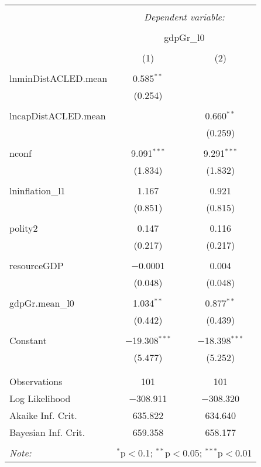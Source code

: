 \begin{table}[!htbp] \centering 
  \caption{} 
  \label{} 
\begin{tabular}{@{\extracolsep{5pt}}lcc} 
\\[-1.8ex]\hline 
\hline \\[-1.8ex] 
 & \multicolumn{2}{c}{\textit{Dependent variable:}} \\ 
\cline{2-3} 
\\[-1.8ex] & \multicolumn{2}{c}{gdpGr\_l0} \\ 
\\[-1.8ex] & (1) & (2)\\ 
\hline \\[-1.8ex] 
 lnminDistACLED.mean & 0.585$^{**}$ &  \\ 
  & (0.254) &  \\ 
  & & \\ 
 lncapDistACLED.mean &  & 0.660$^{**}$ \\ 
  &  & (0.259) \\ 
  & & \\ 
 nconf & 9.091$^{***}$ & 9.291$^{***}$ \\ 
  & (1.834) & (1.832) \\ 
  & & \\ 
 lninflation\_l1 & 1.167 & 0.921 \\ 
  & (0.851) & (0.815) \\ 
  & & \\ 
 polity2 & 0.147 & 0.116 \\ 
  & (0.217) & (0.217) \\ 
  & & \\ 
 resourceGDP & $-$0.0001 & 0.004 \\ 
  & (0.048) & (0.048) \\ 
  & & \\ 
 gdpGr.mean\_l0 & 1.034$^{**}$ & 0.877$^{**}$ \\ 
  & (0.442) & (0.439) \\ 
  & & \\ 
 Constant & $-$19.308$^{***}$ & $-$18.398$^{***}$ \\ 
  & (5.477) & (5.252) \\ 
  & & \\ 
\hline \\[-1.8ex] 
Observations & 101 & 101 \\ 
Log Likelihood & $-$308.911 & $-$308.320 \\ 
Akaike Inf. Crit. & 635.822 & 634.640 \\ 
Bayesian Inf. Crit. & 659.358 & 658.177 \\ 
\hline 
\hline \\[-1.8ex] 
\textit{Note:}  & \multicolumn{2}{r}{$^{*}$p$<$0.1; $^{**}$p$<$0.05; $^{***}$p$<$0.01} \\ 
\end{tabular} 
\end{table}  
